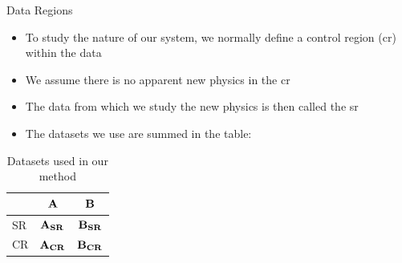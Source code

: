 \documentclass[notheorems]{beamer}
\begin{document}
\begin{frame}{Data Regions}
    \begin{itemize}
        \item To study the nature of our system, we normally define a control region (\gls{cr}) within the data
        \item We assume there is no apparent new physics in the \gls{cr}
        \item The data from which we study the new physics is then called the \gls{sr}
        \item The datasets we use are summed in the table:
        \end{itemize}
    \begin{table}[ht]%
        \caption{\label{table:division_of_data}}
        \begin{tabular}{| l | c | c |}
            & ${\mathbf{A}}$ & ${\mathbf{B}}$ \\
            \hline
            SR & ${\mathbf{A_{SR}}}$ & ${\mathbf{B_{SR}}}$ \\
            CR & ${\mathbf{A_{CR}}}$ & ${\mathbf{B_{CR}}}$ \\
            \end{tabular}
        \caption{Datasets used in our method}
    \end{table}
\end{frame}
\end{document}
